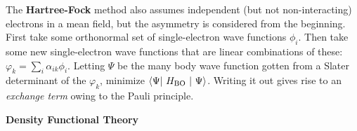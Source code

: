 \documentclass[10pt,landscape]{article}
\newcommand{\topiccolor}{green}
\newcommand{\cbf}[1]{\textcolor{\topiccolor!70!black}{\textbf{#1}}}
\begin{document}
\begin{multicols*}{3}
The \cbf{Hartree-Fock} method also assumes independent (but not non-interacting) 
electrons in a mean field, but the asymmetry is considered from the beginning.
First take some orthonormal set of single-electron wave functions $\phi_i$.
Then take some new single-electron wave functions that are linear combinations
of these: $\varphi_k = \sum_i \alpha_{ik} \phi_i$.
Letting $\Psi$ be the many body wave function gotten from a Slater determinant
of the $\varphi_k$, minimize $\braket{\Psi | H_\text{BO} | \Psi}$.
Writing it out gives rise to an \emph{exchange term} owing to the Pauli
principle.

\cbf{Density Functional Theory}



\end{multicols*}
\end{document}
